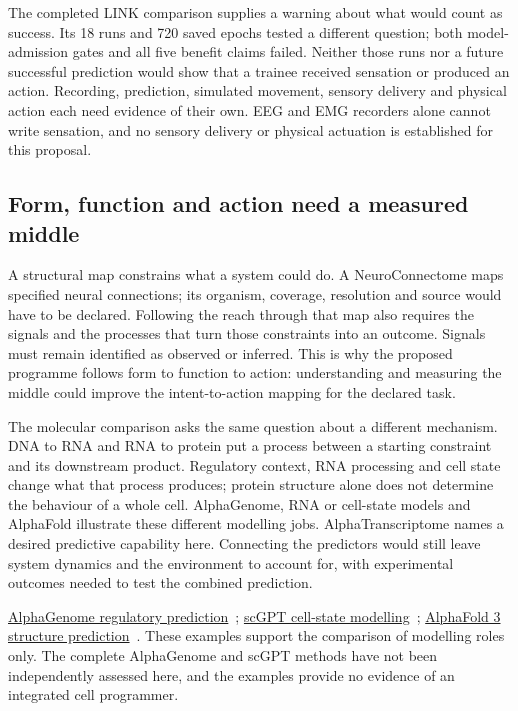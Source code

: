 The completed LINK comparison supplies a warning about what would count as
success. Its 18 runs and 720 saved epochs tested a different question; both
model-admission gates and all five benefit claims failed. Neither those runs
nor a future successful prediction would show that a trainee received sensation
or produced an action. Recording, prediction, simulated movement, sensory
delivery and physical action each need evidence of their own. EEG and EMG
recorders alone cannot write sensation, and no sensory delivery or physical
actuation is established for this proposal.

\subsection{Form, function and action need a measured middle}
A structural map constrains what a system could do. A NeuroConnectome maps
specified neural connections; its organism, coverage, resolution and source
would have to be declared. Following the reach through that map also requires
the signals and the processes that turn those constraints into an outcome.
Signals must remain identified as observed or inferred. This is why the proposed
programme follows form to function to action: understanding and measuring the
middle could improve the intent-to-action mapping for the declared task.

The molecular comparison asks the same question about a different mechanism.
DNA to RNA and RNA to protein put a process between a starting constraint and its
downstream product. Regulatory context, RNA processing and cell state change
what that process produces; protein structure alone does not determine the
behaviour of a whole cell. AlphaGenome, RNA or cell-state models and AlphaFold
illustrate these different modelling jobs. AlphaTranscriptome names a desired
predictive capability here. Connecting the predictors would still leave system
dynamics and the environment to account for, with experimental outcomes needed
to test the combined prediction.
\par\noindent \href{https://www.nature.com/articles/s41586-025-10014-0}{AlphaGenome regulatory prediction}~\cite{alphagenomeRetained};
\href{https://www.nature.com/articles/s41592-024-02201-0}{scGPT cell-state modelling}~\cite{scgptRetained};
\href{https://www.nature.com/articles/s41586-024-07487-w}{AlphaFold 3 structure prediction}~\cite{abramson2024}.
These examples support the comparison of modelling roles only. The complete
AlphaGenome and scGPT methods have not been independently assessed here, and
the examples provide no evidence of an integrated cell programmer.

